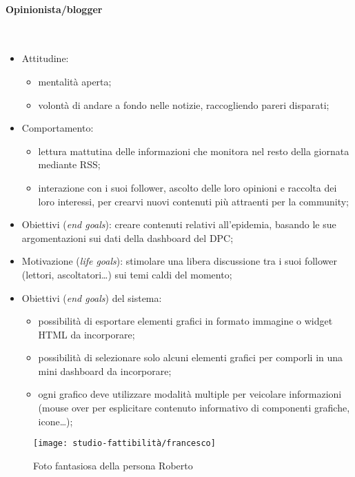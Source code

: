 \paragraph{Opinionista/blogger}\mbox{}\\
\begin{itemize}
    \item Attitudine:
    \begin{itemize}
        \item mentalità aperta;
        \item volontà di andare a fondo nelle notizie, raccogliendo pareri disparati;
    \end{itemize}
    \item Comportamento: 
    \begin{itemize}
        \item lettura mattutina delle informazioni che monitora nel resto della giornata mediante RSS;
        \item interazione con i suoi follower, ascolto delle loro opinioni e raccolta dei loro interessi, per crearvi nuovi contenuti più attraenti per la community;
    \end{itemize}
    \item Obiettivi (\textit{end goals}): creare contenuti relativi all'epidemia, basando le sue argomentazioni sui dati della dashboard del DPC;
    \item Motivazione (\textit{life goals}): stimolare una libera discussione tra i suoi follower (lettori, ascoltatori…) sui temi caldi del momento;
    \item Obiettivi (\textit{end goals}) del sistema:
    \begin{itemize}
        \item possibilità di esportare elementi grafici in formato immagine o widget HTML da incorporare;
        \item possibilità di selezionare solo alcuni elementi grafici per comporli in una mini dashboard da incorporare; 
        \item ogni grafico deve utilizzare modalità multiple per veicolare informazioni (mouse over per esplicitare contenuto informativo di componenti grafiche, icone…); 
    \end{itemize}
\end{itemize}

\begin{wrapfigure}{l}{7cm}
    \texttt{[image: studio-fattibilità/francesco]}
    \caption{Foto fantasiosa della persona Roberto}
\end{wrapfigure}


